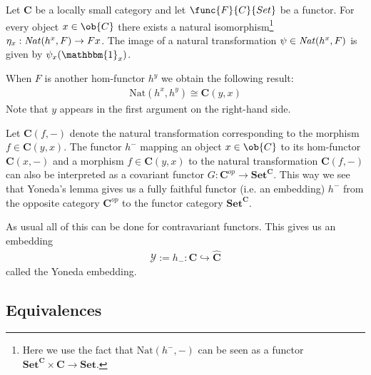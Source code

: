     \begin{theorem}
        Let $\mathbf{C}$ be a locally small category and let $\func{F}{C}{Set}$ be a functor. For every object $x\in\ob{C}$ there exists a natural isomorphism\footnote{Here we use the fact that $\text{Nat}(h^-, -)$ can be seen as a functor $\mathbf{Set}^{\mathbf{C}}\times\mathbf{C}\rightarrow\mathbf{Set}$.} $\eta_x:\text{\emph{Nat}}(h^x, F)\rightarrow Fx$. The image of a natural transformation $\psi\in\text{\emph{Nat}}(h^x, F)$ is given by $\psi_x(\mathbbm{1}_x)$.
    \end{theorem}

    \begin{result}
        When $F$ is another hom-functor $h^y$ we obtain the following result:
        \begin{gather}
            \text{Nat}(h^x, h^y)\cong\mathbf{C}(y, x)
        \end{gather}
        Note that $y$ appears in the first argument on the right-hand side.

        Let $\mathbf{C}(f, -)$ denote the natural transformation corresponding to the morphism $f\in\mathbf{C}(y,x)$. The functor $h^-$ mapping an object $x\in\ob{C}$ to its hom-functor $\mathbf{C}(x, -)$ and a morphism $f\in\mathbf{C}(y, x)$ to the natural transformation $\mathbf{C}(f, -)$ can also be interpreted as a covariant functor $G:\mathbf{C}^{op}\rightarrow\mathbf{Set}^{\mathbf{C}}$. This way we see that Yoneda's lemma gives us a fully faithful functor (i.e. an embedding) $h^-$ from the opposite category $\mathbf{C}^{op}$ to the functor category $\mathbf{Set}^{\mathbf{C}}$.

        As usual all of this can be done for contravariant functors. This gives us an embedding
        \begin{gather}
            \mathcal{Y}:=h_-:\mathbf{C}\hookrightarrow\widehat{\mathbf{C}}
        \end{gather}
        called the Yoneda embedding.
    \end{result}

\subsection{Equivalences}


